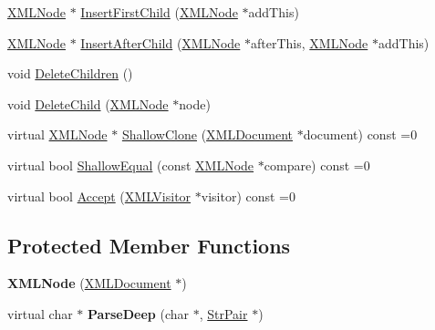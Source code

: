 \begin{DoxyCompactItemize}
\item 
\hyperlink{classtinyxml2_1_1_x_m_l_node}{X\+M\+L\+Node} $\ast$ \hyperlink{classtinyxml2_1_1_x_m_l_node_a8ff7dc071f3a1a6ae2ac25a37492865d}{Insert\+First\+Child} (\hyperlink{classtinyxml2_1_1_x_m_l_node}{X\+M\+L\+Node} $\ast$add\+This)
\item 
\hyperlink{classtinyxml2_1_1_x_m_l_node}{X\+M\+L\+Node} $\ast$ \hyperlink{classtinyxml2_1_1_x_m_l_node_a85adb8f0b7477eec30f9a41d420b09c2}{Insert\+After\+Child} (\hyperlink{classtinyxml2_1_1_x_m_l_node}{X\+M\+L\+Node} $\ast$after\+This, \hyperlink{classtinyxml2_1_1_x_m_l_node}{X\+M\+L\+Node} $\ast$add\+This)
\item 
void \hyperlink{classtinyxml2_1_1_x_m_l_node_a0360085cc54df5bff85d5c5da13afdce}{Delete\+Children} ()
\item 
void \hyperlink{classtinyxml2_1_1_x_m_l_node_a363b6edbd6ebd55f8387d2b89f2b0921}{Delete\+Child} (\hyperlink{classtinyxml2_1_1_x_m_l_node}{X\+M\+L\+Node} $\ast$node)
\item 
virtual \hyperlink{classtinyxml2_1_1_x_m_l_node}{X\+M\+L\+Node} $\ast$ \hyperlink{classtinyxml2_1_1_x_m_l_node_a8402cbd3129d20e9e6024bbcc0531283}{Shallow\+Clone} (\hyperlink{classtinyxml2_1_1_x_m_l_document}{X\+M\+L\+Document} $\ast$document) const =0
\item 
virtual bool \hyperlink{classtinyxml2_1_1_x_m_l_node_a7ce18b751c3ea09eac292dca264f9226}{Shallow\+Equal} (const \hyperlink{classtinyxml2_1_1_x_m_l_node}{X\+M\+L\+Node} $\ast$compare) const =0
\item 
virtual bool \hyperlink{classtinyxml2_1_1_x_m_l_node_a81e66df0a44c67a7af17f3b77a152785}{Accept} (\hyperlink{classtinyxml2_1_1_x_m_l_visitor}{X\+M\+L\+Visitor} $\ast$visitor) const =0
\end{DoxyCompactItemize}
\subsection*{Protected Member Functions}
\begin{DoxyCompactItemize}
\item 
\hypertarget{classtinyxml2_1_1_x_m_l_node_a29868df6ca383d574f584dfdd15105b6}{}{\bfseries X\+M\+L\+Node} (\hyperlink{classtinyxml2_1_1_x_m_l_document}{X\+M\+L\+Document} $\ast$)\label{classtinyxml2_1_1_x_m_l_node_a29868df6ca383d574f584dfdd15105b6}

\item 
\hypertarget{classtinyxml2_1_1_x_m_l_node_a8263ad55d894578e8e72a65c56649138}{}virtual char $\ast$ {\bfseries Parse\+Deep} (char $\ast$, \hyperlink{classtinyxml2_1_1_str_pair}{Str\+Pair} $\ast$)\label{classtinyxml2_1_1_x_m_l_node_a8263ad55d894578e8e72a65c56649138}

\end{DoxyCompactItemize}

